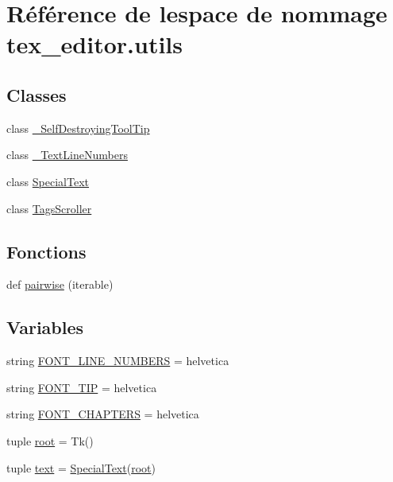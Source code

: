 \hypertarget{namespacetex__editor_1_1utils}{}\section{Référence de l\textquotesingle{}espace de nommage tex\+\_\+editor.\+utils}
\label{namespacetex__editor_1_1utils}
\subsection*{Classes}
\begin{DoxyCompactItemize}
\item 
class \hyperlink{classtex__editor_1_1utils_1_1___self_destroying_tool_tip}{\+\_\+\+Self\+Destroying\+Tool\+Tip}
\item 
class \hyperlink{classtex__editor_1_1utils_1_1___text_line_numbers}{\+\_\+\+Text\+Line\+Numbers}
\item 
class \hyperlink{classtex__editor_1_1utils_1_1_special_text}{Special\+Text}
\item 
class \hyperlink{classtex__editor_1_1utils_1_1_tags_scroller}{Tags\+Scroller}
\end{DoxyCompactItemize}
\subsection*{Fonctions}
\begin{DoxyCompactItemize}
\item 
def \hyperlink{namespacetex__editor_1_1utils_ae6ae204f4c96eb54201b9a711bc7f663}{pairwise} (iterable)
\end{DoxyCompactItemize}
\subsection*{Variables}
\begin{DoxyCompactItemize}
\item 
string \hyperlink{namespacetex__editor_1_1utils_af2e45f961d243bf5ba03993ad458dcad}{F\+O\+N\+T\+\_\+\+L\+I\+N\+E\+\_\+\+N\+U\+M\+B\+E\+R\+S} = \textquotesingle{}helvetica\textquotesingle{}
\item 
string \hyperlink{namespacetex__editor_1_1utils_aa70b755d3969f26880796c74750e3f60}{F\+O\+N\+T\+\_\+\+T\+I\+P} = \textquotesingle{}helvetica\textquotesingle{}
\item 
string \hyperlink{namespacetex__editor_1_1utils_ae4f00682d7a07f963083e407675cd902}{F\+O\+N\+T\+\_\+\+C\+H\+A\+P\+T\+E\+R\+S} = \textquotesingle{}helvetica\textquotesingle{}
\item 
tuple \hyperlink{namespacetex__editor_1_1utils_a4b615cf115c5836ca71ec79d5b9caa0f}{root} = Tk()
\item 
tuple \hyperlink{namespacetex__editor_1_1utils_ae4fa308d3c65a5223578baf4c1ec4ddd}{text} = \hyperlink{classtex__editor_1_1utils_1_1_special_text}{Special\+Text}(\hyperlink{namespacetex__editor_1_1utils_a4b615cf115c5836ca71ec79d5b9caa0f}{root})
\end{DoxyCompactItemize}


